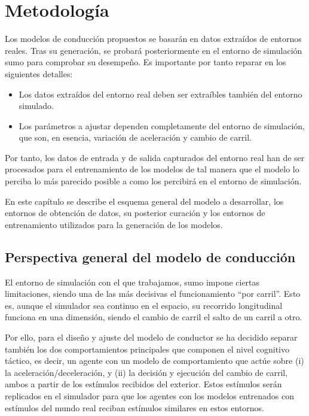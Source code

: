 \chapter{Metodología}
\label{ch:methodology}

Los modelos de conducción propuestos se basarán en datos extraídos de entornos reales. Tras su generación, se probará posteriormente en el entorno de simulación \ac{sumo} para comprobar su desempeño. Es importante por tanto reparar en los siguientes detalles:

\begin{itemize}
	\item Los datos extraídos del entorno real deben ser extraíbles también del entorno simulado. 
	\item Los parámetros a ajustar dependen completamente del entorno de simulación, que son, en esencia, variación de aceleración y cambio de carril.
\end{itemize}

Por tanto, los datos de entrada y de salida capturados del entorno real han de ser procesados para el entrenamiento de los modelos de tal manera que el modelo lo perciba lo más parecido posible a como los percibirá en el entorno de simulación.

En este capítulo se describe el esquema general del modelo a desarrollar, los entornos de obtención de datos, su posterior curación y los entornos de entrenamiento utilizados para la generación de los modelos.

\section{Perspectiva general del modelo de conducción}

El entorno de simulación con el que trabajamos, \ac{sumo} impone ciertas limitaciones, siendo una de las más decisivas el funcionamiento \enquote{por carril}. Esto es, aunque el simulador sea continuo en el espacio, su recorrido longitudinal funciona en una dimensión, siendo el cambio de carril el salto de un carril a otro.

Por ello, para el diseño y ajuste del modelo de conductor se ha decidido separar también los dos comportamientos principales que componen el nivel cognitivo táctico, es decir, un agente con un modelo de comportamiento que actúe sobre (i) la aceleración/deceleración, y (ii) la decisión y ejecución del cambio de carril, ambos a partir de los estímulos recibidos del exterior. Estos estímulos serán replicados en el simulador para que los agentes con los modelos entrenados con estímulos del mundo real reciban estímulos similares en estos entornos.

